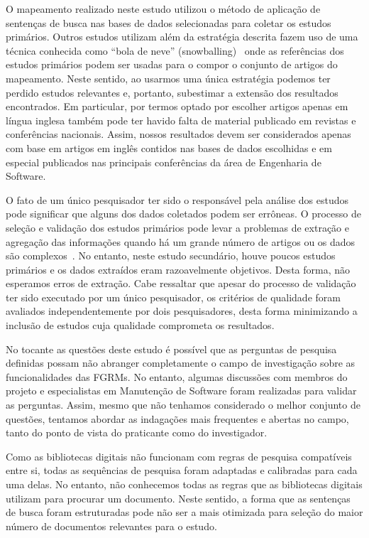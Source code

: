 O mapeamento realizado neste estudo utilizou o método de aplicação de sentenças
de busca nas bases de dados selecionadas para coletar os estudos primários.
Outros estudos utilizam além da estratégia descrita fazem uso de uma técnica
conhecida  como ``bola de neve'' (snowballing)~\cite{wohlin2014guidelines} onde
as referências dos estudos primários podem ser usadas para o compor o conjunto
de artigos do mapeamento. Neste sentido, ao usarmos uma única estratégia podemos
ter perdido estudos relevantes e, portanto, subestimar a extensão dos resultados
encontrados. Em particular, por termos optado por escolher artigos apenas em
língua inglesa também pode ter havido falta de material publicado em revistas e
conferências nacionais. Assim, nossos resultados devem ser considerados apenas
com base em artigos em inglês contidos nas bases de dados escolhidas  e em
especial publicados nas principais conferências da área de Engenharia de
Software.

O fato de um único pesquisador ter sido o responsável pela análise dos estudos
pode significar que alguns dos dados coletados podem ser errôneas. O processo de
seleção e validação dos estudos primários pode levar a problemas de extração e
agregação das informações quando há um grande número de artigos ou os dados são
complexos~\cite{keele2007guidelines}. No entanto, neste estudo secundário, houve
poucos estudos primários e os dados extraídos eram razoavelmente objetivos.
Desta forma, não esperamos erros de extração. Cabe ressaltar que apesar do
processo de validação ter sido executado por um único pesquisador, os critérios
de qualidade foram avaliados independentemente por dois pesquisadores, desta
forma minimizando a inclusão de estudos cuja qualidade comprometa os resultados.

No tocante as questões deste estudo  é  possível que as perguntas de pesquisa
definidas possam não abranger completamente o campo de investigação sobre as
funcionalidades das FGRMs. No entanto, algumas discussões com membros do
projeto e especialistas em Manutenção de Software foram realizadas para validar
as perguntas. Assim, mesmo que não tenhamos considerado o melhor conjunto de
questões, tentamos abordar as indagações mais frequentes e abertas no campo,
tanto do ponto de vista do praticante como do investigador.

Como as bibliotecas digitais não funcionam com regras de pesquisa compatíveis
entre si, todas as sequências de pesquisa foram adaptadas e calibradas para cada
uma delas. No entanto, não conhecemos todas as regras que as bibliotecas
digitais utilizam para procurar um documento. Neste sentido, a forma que as
sentenças de busca foram estruturadas pode não ser a mais otimizada para seleção
do maior número de documentos relevantes para o estudo.

